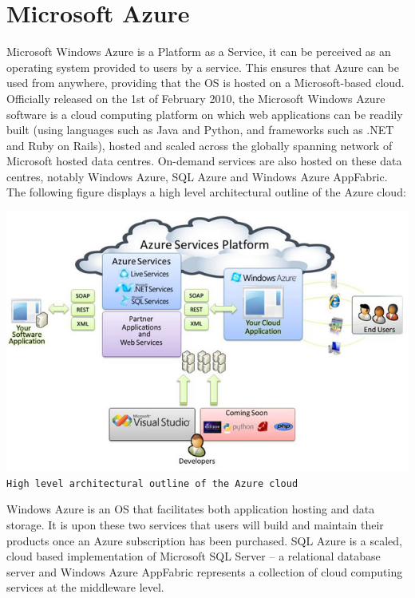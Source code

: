 \chapter{Microsoft Azure}
Microsoft Windows Azure is a Platform as a Service, it can be perceived as an operating system provided to users by a service. This ensures that Azure can be used from anywhere, providing that the OS is hosted on a Microsoft-based cloud. Officially released on the 1st of February 2010, the Microsoft Windows Azure software is a cloud computing platform on which web applications can be readily built (using languages such as Java and Python, and frameworks such as .NET and Ruby on Rails), hosted and scaled across the globally spanning network of Microsoft hosted data centres. On-demand services are also hosted on these data centres, notably Windows Azure\ftAone, SQL Azure and Windows Azure AppFabric. The following figure displays a high level architectural outline of the Azure cloud:\ftAoneText

\begin{center}
\includegraphics[scale=0.8]{figs/Azure.png} \\
\texttt{High level architectural outline of the Azure cloud}\ftAimg\ftAimgText
\end{center}

Windows Azure is an OS that facilitates both application hosting and data storage. It is upon these two services that users will build and maintain their products once an Azure subscription has been purchased. SQL Azure is a scaled, cloud based implementation of Microsoft SQL Server -- a relational database server and Windows Azure AppFabric represents a collection of cloud computing services at the middleware level.


